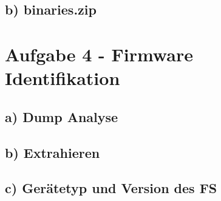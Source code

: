 \subsection*{b) binaries.zip}



\section*{Aufgabe 4 - Firmware Identifikation}

\subsection*{a) Dump Analyse}


\subsection*{b) Extrahieren}


\subsection*{c) Gerätetyp und Version des FS}

